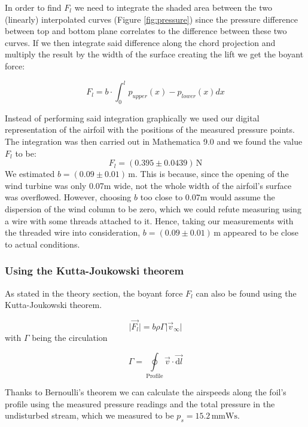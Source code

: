 \documentclass{scrreprt}
\newcommand{\unit}[1]{\ensuremath{\, \mathrm{#1}}}
\begin{document}
In order to find $F_l$ we need to integrate the shaded area between the two (linearly) interpolated curves (Figure \ref{fig:pressure}) since the pressure difference between top and bottom plane correlates to the difference between these two curves. If we then integrate said difference along the chord projection and multiply the result by the width of the surface creating the lift we get the boyant force:

\begin{equation}
F_l = b \cdot \int_0^l{p_{upper}(x)-p_{lower}(x)dx}
\end{equation}

Instead of performing said integration graphically we used our digital representation of the airfoil with the positions of the measured pressure points. The integration was then carried out in Mathematica 9.0 and we found the value $F_l$ to be:
\[F_l = (0.395 \pm 0.0439) \unit{N}\]
We estimated $b=(0.09 \pm 0.01)\unit{m}$. This is because, since the opening of the wind turbine was only 0.07m wide, not the whole width of the airfoil's surface was overflowed. However, choosing $b$ too close to 0.07m would assume the dispersion of the wind column to be zero, which we could refute measuring using a wire with some threads attached to it. Hence, taking our measurements with the threaded wire into consideration, $b=(0.09 \pm 0.01)\unit{m}$ appeared to be close to actual conditions.

\subsubsection{Using the Kutta-Joukowski theorem}

As stated in the theory section, the boyant force $F_l$ can also be found using the Kutta-Joukowski theorem.

\begin{equation}
\lvert \vec{F_l}\rvert = b \rho \Gamma \lvert \vec{v}_\infty \rvert
\end{equation}
with $\Gamma$ being the circulation

\begin{equation}
\Gamma = \oint\limits_{\text{Profile}}\!\vec{v}\cdot\vec{\mathrm{d} l}\label{eq:integral}
\end{equation}

Thanks to Bernoulli's theorem we can calculate the airspeeds along the foil's profile using the measured pressure readings and the total pressure in the undisturbed stream, which we measured to be $p_s= 15.2 \unit{mmWs}$.
\end{document}
